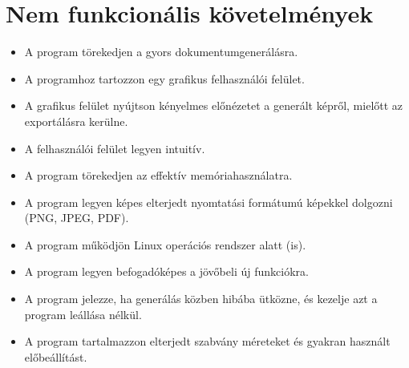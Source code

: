 \section{Nem funkcionális követelmények}
\begin{itemize}
    \item A program törekedjen a gyors dokumentumgenerálásra. 
    \item A programhoz tartozzon egy grafikus felhasználói felület.
    \item A grafikus felület nyújtson kényelmes előnézetet a generált képről, mielőtt az exportálásra kerülne. 
    \item A felhasználói felület legyen intuitív.
    \item A program törekedjen az effektív memóriahasználatra.
    \item A program legyen képes elterjedt nyomtatási formátumú képekkel dolgozni (PNG, JPEG, PDF). 
    \item A program működjön Linux operációs rendszer alatt (is).
    \item A program legyen befogadóképes a jövőbeli új funkciókra.
    \item A program jelezze, ha generálás közben hibába ütközne, és kezelje azt a program leállása nélkül.
    \item A program tartalmazzon elterjedt szabvány méreteket és gyakran használt előbeállítást.
\end{itemize}